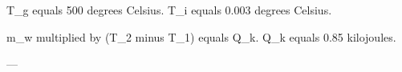 T_g equals 500 degrees Celsius.  
T_i equals 0.003 degrees Celsius.  

m_w multiplied by (T_2 minus T_1) equals Q_k.  
Q_k equals 0.85 kilojoules.  

---